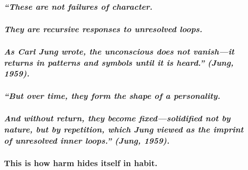 \subsubsection{\texorpdfstring{\emph{``These are not failures of
character.}}{``These are not failures of character.}}\label{these-are-not-failures-of-character.}

\subsubsection{\texorpdfstring{\emph{They are recursive responses to
unresolved
loops.}}{They are recursive responses to unresolved loops.}}\label{they-are-recursive-responses-to-unresolved-loops.}

\subsubsection{\texorpdfstring{\emph{As Carl Jung wrote, the unconscious
does not vanish---it returns in patterns and symbols until it is
heard.''} \emph{(Jung,
1959).}}{As Carl Jung wrote, the unconscious does not vanish---it returns in patterns and symbols until it is heard.'' (Jung, 1959).}}\label{as-carl-jung-wrote-the-unconscious-does-not-vanishit-returns-in-patterns-and-symbols-until-it-is-heard.-jung-1959.}

\subsubsection{\texorpdfstring{\emph{``But over time, they form the
shape of a
personality.}}{``But over time, they form the shape of a personality.}}\label{but-over-time-they-form-the-shape-of-a-personality.}

\subsubsection{\texorpdfstring{\emph{And without return, they become
fixed---solidified not by nature, but by repetition, which Jung viewed
as the imprint of unresolved inner loops.'' (Jung,
1959).}}{And without return, they become fixed---solidified not by nature, but by repetition, which Jung viewed as the imprint of unresolved inner loops.'' (Jung, 1959).}}\label{and-without-return-they-become-fixedsolidified-not-by-nature-but-by-repetition-which-jung-viewed-as-the-imprint-of-unresolved-inner-loops.-jung-1959.}

\subsubsection{This is how harm hides itself in
habit.}\label{this-is-how-harm-hides-itself-in-habit.}

